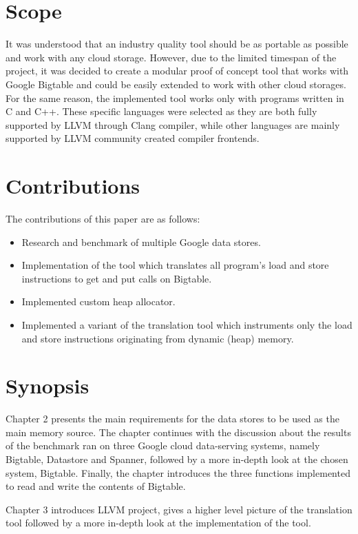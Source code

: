 \documentclass[bsc,frontabs,twoside,singlespacing,parskip,deptreport]{infthesis}     %
\begin{document}
\section{Scope}

It was understood that an industry quality tool should be as portable as possible and work with any cloud storage. However, due to the limited timespan of the project, it was decided to create a modular proof of concept tool that works with Google Bigtable and could be easily extended to work with other cloud storages. For the same reason, the implemented tool works only with programs written in C and C++. These specific languages were selected as they are both fully supported by LLVM through Clang compiler, while other languages are mainly supported by LLVM community created compiler frontends.

\section{Contributions}

The contributions of this paper are as follows:
\begin{itemize}
\item
Research and benchmark of multiple Google data stores.
\item
Implementation of the tool which translates all program's load and store instructions to get and put calls on Bigtable.
\item
Implemented custom heap allocator.
\item
Implemented a variant of the translation tool which instruments only the load and store instructions originating from dynamic (heap) memory.
\end{itemize}

\section{Synopsis}

Chapter 2 presents the main requirements for the data stores to be used as the main memory source. The chapter continues with the discussion about the results of the benchmark ran on three Google cloud data-serving systems, namely Bigtable, Datastore and Spanner, followed by a more in-depth look at the chosen system, Bigtable. Finally, the chapter introduces the three functions implemented to read and write the contents of Bigtable.

Chapter 3 introduces LLVM project, gives a higher level picture of the translation tool followed by a more in-depth look at the implementation of the tool.
\end{document}
